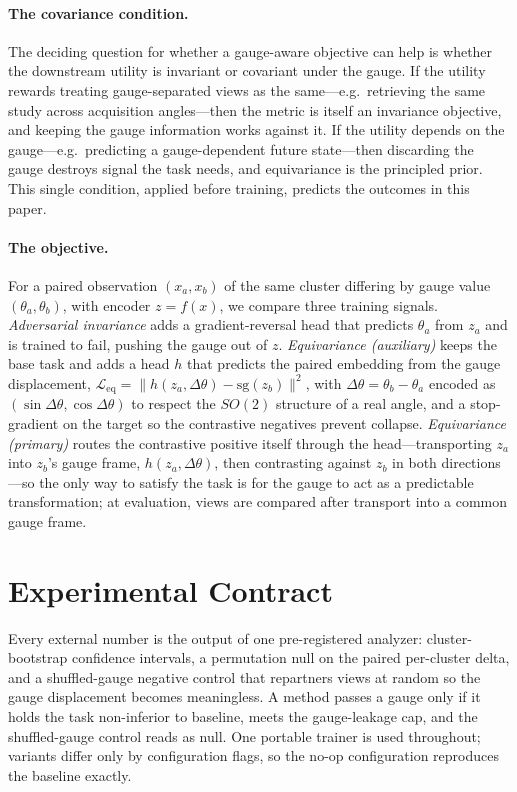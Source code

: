 \documentclass[11pt]{article}
\begin{document}
\paragraph{The covariance condition.}
The deciding question for whether a gauge-aware objective can help is whether the downstream utility
is invariant or covariant under the gauge. If the utility rewards treating gauge-separated views as
the same---e.g.\ retrieving the same study across acquisition angles---then the metric is itself an
invariance objective, and keeping the gauge information works against it. If the utility depends on
the gauge---e.g.\ predicting a gauge-dependent future state---then discarding the gauge destroys
signal the task needs, and equivariance is the principled prior. This single condition, applied
before training, predicts the outcomes in this paper.

\paragraph{The objective.}
For a paired observation $(x_a,x_b)$ of the same cluster differing by gauge value
$(\theta_a,\theta_b)$, with encoder $z=f(x)$, we compare three training signals. \emph{Adversarial
invariance} adds a gradient-reversal head that predicts $\theta_a$ from $z_a$ and is trained to fail,
pushing the gauge out of $z$. \emph{Equivariance (auxiliary)} keeps the base task and adds a head
$h$ that predicts the paired embedding from the gauge displacement,
$\mathcal{L}_{\mathrm{eq}}=\lVert h(z_a,\Delta\theta)-\mathrm{sg}(z_b)\rVert^2$, with
$\Delta\theta=\theta_b-\theta_a$ encoded as $(\sin\Delta\theta,\cos\Delta\theta)$ to respect the
$SO(2)$ structure of a real angle, and a stop-gradient on the target so the contrastive negatives
prevent collapse. \emph{Equivariance (primary)} routes the contrastive positive itself through the
head---transporting $z_a$ into $z_b$'s gauge frame, $h(z_a,\Delta\theta)$, then contrasting against
$z_b$ in both directions---so the only way to satisfy the task is for the gauge to act as a
predictable transformation; at evaluation, views are compared after transport into a common gauge
frame.

\section{Experimental Contract}\label{sec:contract}

Every external number is the output of one pre-registered analyzer: cluster-bootstrap confidence
intervals, a permutation null on the paired per-cluster delta, and a shuffled-gauge negative control
that repartners views at random so the gauge displacement becomes meaningless. A method passes a
gauge only if it holds the task non-inferior to baseline, meets the gauge-leakage cap, and the
shuffled-gauge control reads as null. One portable trainer is used throughout; variants differ only
by configuration flags, so the no-op configuration reproduces the baseline exactly.
\end{document}
